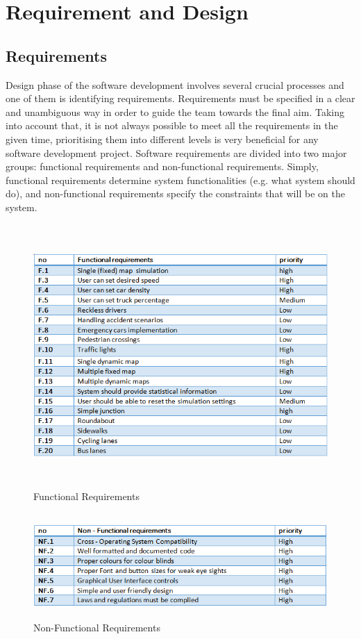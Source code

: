 \section{Requirement and Design}

\subsection{Requirements}
Design phase of the software development involves several crucial processes and one of them is identifying requirements. Requirements must be specified in a clear and unambiguous way in order to guide the team towards the final aim. Taking into account that,  it is not always possible to meet all the requirements in the given time,  prioritising them into different levels is very  beneficial for any software development project.  Software requirements are divided into two major groups: functional requirements and non-functional requirements. Simply, functional requirements determine system functionalities (e.g. what system should do), and non-functional requirements specify the constraints that will be on the system\cite{msads}.

\begin{figure}[h]
\includegraphics[width=14cm, height=10cm]{pics/FR}
\centering
\caption{Functional Requirements}
\end{figure}

\begin{figure}[H]
\includegraphics[width=14cm, height=4cm]{pics/NFR}
\centering
\caption{Non-Functional Requirements}
\end{figure}


